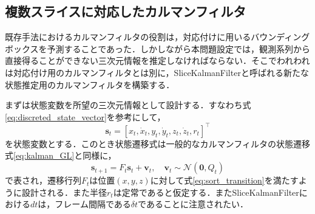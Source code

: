     \subsection{複数スライスに対応したカルマンフィルタ}
    \label{subsec:sliced_kalman_filter}
    
    既存手法におけるカルマンフィルタの役割は，対応付けに用いるバウンディングボックスを予測することであった．しかしながら本問題設定では，観測系列から直接得ることができない三次元情報を推定しなければならない．そこでわれわれは対応付け用のカルマンフィルタとは別に，SliceKalmanFilterと呼ばれる新たな状態推定用のカルマンフィルタを構築する．
    
    まずは状態変数を所望の三次元情報として設計する．すなわち式\ref{eq:discreted_state_vector}を参考にして，
    \begin{equation}
        \label{eq:skf_state_vector}
        \bm{s}_t = \left[x_t, \dot{x}_t, y_t, \dot{y}_t, z_t, \dot{z}_t, r_t\right]^{\top}
    \end{equation}
    を状態変数とする．このとき状態遷移式は一般的なカルマンフィルタの状態遷移式\ref{eq:kalman_GL}と同様に，
    \begin{equation}
        \label{eq:skf_state_transition}
        \bm{s}_{t+1} = F_t \bm{s}_t + \bm{v}_t, \quad \bm{v}_t \sim \mathcal{N}(\bm{0}, Q_t)
    \end{equation}
    で表され，遷移行列$F_t$は位置$(x,y,z)$に対して式\ref{eq:sort_transition}を満たすように設計される．また半径$r_t$は定常であると仮定する．またSliceKalmanFilterにおける$dt$は，フレーム間隔である$\delta t$であることに注意されたい．

